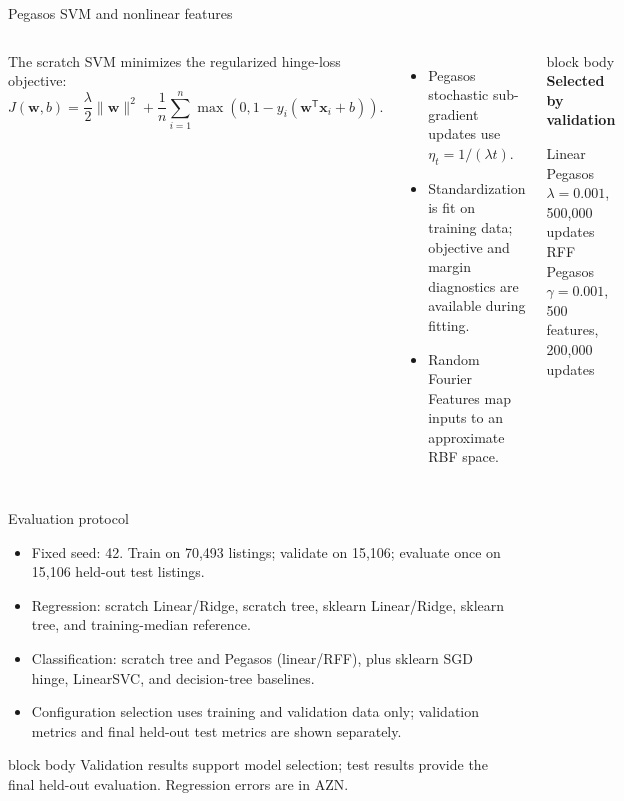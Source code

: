 \documentclass[aspectratio=169,10pt]{beamer}
\begin{document}
\begin{frame}{Pegasos SVM and nonlinear features}
  \begin{columns}[T,onlytextwidth]
      The scratch SVM minimizes the regularized hinge-loss objective:
      \[
        J(\mathbf{w},b)=\frac{\lambda}{2}\|\mathbf{w}\|^2+
        \frac{1}{n}\sum_{i=1}^{n}\max\!\left(0,
        1-y_i(\mathbf{w}^{\mathsf T}\mathbf{x}_i+b)\right).
      \]
      \begin{itemize}
        \item Pegasos stochastic sub-gradient updates use
          $\eta_t=1/(\lambda t)$.
        \item Standardization is fit on training data; objective and margin
          diagnostics are available during fitting.
        \item Random Fourier Features map inputs to an approximate RBF space.
      \end{itemize}
      \begin{beamercolorbox}[wd=\linewidth,sep=0.8em,rounded=true]{block body}
        \textbf{Selected by validation}\par\vspace{0.2cm}
        Linear Pegasos\\
        $\lambda=0.001$, 500,000 updates\\[0.2cm]
        RFF Pegasos\\
        $\gamma=0.001$, 500 features, 200,000 updates
      \end{beamercolorbox}
  \end{columns}
\end{frame}

\begin{frame}{Evaluation protocol}
  \begin{itemize}
    \item Fixed seed: 42. Train on 70,493 listings; validate on 15,106;
      evaluate once on 15,106 held-out test listings.
    \item Regression: scratch Linear/Ridge, scratch tree, sklearn Linear/Ridge,
      sklearn tree, and training-median reference.
    \item Classification: scratch tree and Pegasos (linear/RFF), plus sklearn
      SGD hinge, LinearSVC, and decision-tree baselines.
    \item Configuration selection uses training and validation data only;
      validation metrics and final held-out test metrics are shown separately.
  \end{itemize}
  \vspace{0.25cm}
  \begin{beamercolorbox}[wd=\linewidth,sep=0.65em,rounded=true]{block body}
    Validation results support model selection; test results provide the final
    held-out evaluation. Regression errors are in AZN.
  \end{beamercolorbox}
\end{frame}
\end{document}
